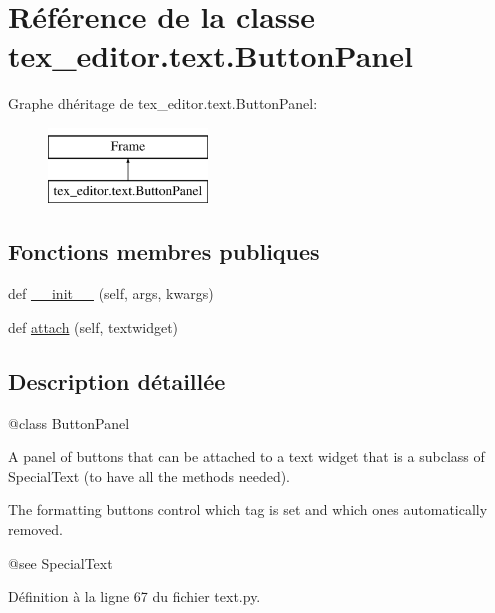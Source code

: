 \hypertarget{classtex__editor_1_1text_1_1_button_panel}{}\section{Référence de la classe tex\+\_\+editor.\+text.\+Button\+Panel}
\label{classtex__editor_1_1text_1_1_button_panel}
Graphe d\textquotesingle{}héritage de tex\+\_\+editor.\+text.\+Button\+Panel\+:\begin{figure}[H]
\begin{center}
\leavevmode
\includegraphics[height=2.000000cm]{classtex__editor_1_1text_1_1_button_panel}
\end{center}
\end{figure}
\subsection*{Fonctions membres publiques}
\begin{DoxyCompactItemize}
\item 
def \hyperlink{classtex__editor_1_1text_1_1_button_panel_a734cef760e167774b45e88297dadc1f7}{\+\_\+\+\_\+init\+\_\+\+\_\+} (self, args, kwargs)
\item 
def \hyperlink{classtex__editor_1_1text_1_1_button_panel_a3d2ba27c5be72cd6b6ada767882153f0}{attach} (self, textwidget)
\end{DoxyCompactItemize}


\subsection{Description détaillée}
\begin{DoxyVerb}@class ButtonPanel

A panel of buttons that can be attached to a text widget that is a subclass
of SpecialText (to have all the methods needed).

The formatting buttons control which tag is set and which ones automatically
removed.

@see SpecialText
\end{DoxyVerb}
 

Définition à la ligne 67 du fichier text.\+py.



